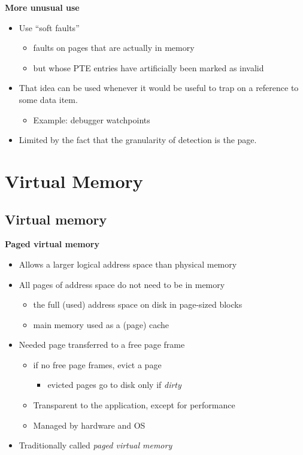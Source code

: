 \documentclass[11pt,a4paper]{article}
\begin{document}
\textbf{More unusual use}
\begin{itemize}
    \item Use ``soft faults''
        \begin{itemize}
            \item faults on pages that are actually in memory
            \item but whose PTE entries have artificially been marked as invalid
        \end{itemize}
    \item That idea can be used whenever it would be useful to trap on a reference to some
        data item.
        \begin{itemize}
            \item Example: debugger watchpoints
        \end{itemize}
    \item Limited by the fact that the granularity of detection is the page.
\end{itemize}

\break{}

\section{Virtual Memory}

\subsection{Virtual memory}

\textbf{Paged virtual memory}
\begin{itemize}
    \item Allows a larger logical address space than physical memory
    \item All pages of address space do not need to be in memory
        \begin{itemize}
            \item the full (used) address space on disk in page-sized blocks
            \item main memory used as a (page) cache
        \end{itemize}
    \item Needed page transferred to a free page frame
        \begin{itemize}
            \item if no free page frames, evict a page
                \begin{itemize}
                    \item evicted pages go to disk only if \emph{dirty}
                \end{itemize}
            \item Transparent to the application, except for performance
            \item Managed by hardware and OS
        \end{itemize}
    \item Traditionally called \emph{paged virtual memory}
\end{itemize}
\end{document}
